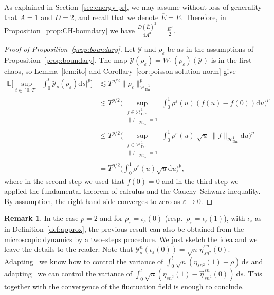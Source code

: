 \documentclass[10pt]{amsart}
\theoremstyle{definition}\newtheorem{defi}[theo]{Definition}\newtheorem{rema}[theo]{Remark}\newtheorem{exam}[theo]{Example}\newtheorem{exem}[theo]{Example}\newtheorem{nota}[theo]{Notation}
\DeclareMathOperator{\Dir}{Dir}
\newcommand{\mc}[1]{{\mathcal #1}}
\renewcommand{\mc}[1]{{\mathcal #1}}
\renewcommand\vec[1]{\overrightarrow{#1}}
\renewcommand{\bar}{\overline}
\renewcommand{\le}{\leqslant}
\newcommand*{\dd}{\mathrm{d}}
\newcommand*{\ds}{\dd s}
\newcommand*{\du}{\dd u}
\begin{document}
As explained in Section~\ref{sec:energy-pr}, we may assume without loss of generality that $A=1$ and $D=2$, and recall that we denote $\bar E=E$. Therefore, in Proposition~\ref{prop:CH-boundary} we have $\frac{D(\bar E)^2}{4A^3}=\frac{E^2}{2}$.

\begin{proof}[Proof of Proposition~\ref{prop:boundary}] Let $\mc Y$ and $\rho_\varepsilon$ be as in the assumptions of Proposition~\ref{prop:boundary}.
The map $\mc Y(\rho_\varepsilon) = W_1 (\rho_\varepsilon) (\mc Y)$ is in the first chaos, so Lemma~\ref{lem:ito} and Corollary~\ref{cor:poisson-solution norm} give
\begin{align*}
\mathbb{E} \bigg[\sup_{t \in [0,T]}
\bigg| \int_0^t \mc Y_s (\rho_{\varepsilon}) \ds \bigg|^p \bigg] & \lesssim T^{p / 2} \big\| \rho_{\varepsilon}
\big\|_{\mc H_{\Dir}^{- 1}}^p \\
& \lesssim T^{p / 2} \Bigg(\sup_{\substack{f \in \mc H_{\Dir}^1\\ \| f\|_{\mc H_{\Dir}^{1}}=1}} \int_0^1 \rho^\varepsilon(u) (f(u) -f(0)) \du \Bigg)^p\\
& \le T^{p / 2} \Bigg(\sup_{\substack{f \in \mc H_{\Dir}^1\\ \| f\|_{\mc H_{\Dir}^{1}}=1}} \int_0^1 \rho^\varepsilon(u) \; \sqrt u \; \|f\|_{\mc H_{\Dir}^{1}} \du \Bigg)^p \\
& = T^{p / 2} \bigg(\int_0^1 \rho^\varepsilon(u) \sqrt u \du\bigg)^p,
\end{align*}
where in the second step we used that $f(0)=0$ and in the third step we applied the fundamental theorem of calculus and the Cauchy--Schwarz inequality. By assumption, the right hand side converges to zero as $\varepsilon \to 0$.
\end{proof}

\begin{rema}
In the case $p=2$ and for $\rho_\varepsilon = \iota_{\varepsilon}(0)$ (resp.~$\rho_\varepsilon = \iota_\varepsilon(1)$), with $\iota_\varepsilon$ as in Definition~\ref{def:approx}, the previous result can also be obtained from the microscopic dynamics by a two--steps procedure. We just sketch the idea and we leave the details to the reader. Note that $\mathcal{Y}_s^n(\iota_{\varepsilon}(0))=\sqrt n \vec\eta_{sn^2}^{\varepsilon n}(0)$. Adapting~\cite[Lemma~3]{Franco2016} we know how to control the variance of $\int_0^t \sqrt n (\eta_{sn^2}(1)-\rho) \, \ds$ and adapting~\cite[Lemma~7.1]{FRANCO20134156} we can control the variance of $\int_0^t \sqrt n (\eta_{sn^2}(1)-\vec\eta_{sn^2}^{\varepsilon n}(0))\ \ds$. This together with the convergence of the fluctuation field is enough to conclude.
\end{rema}
\end{document}
